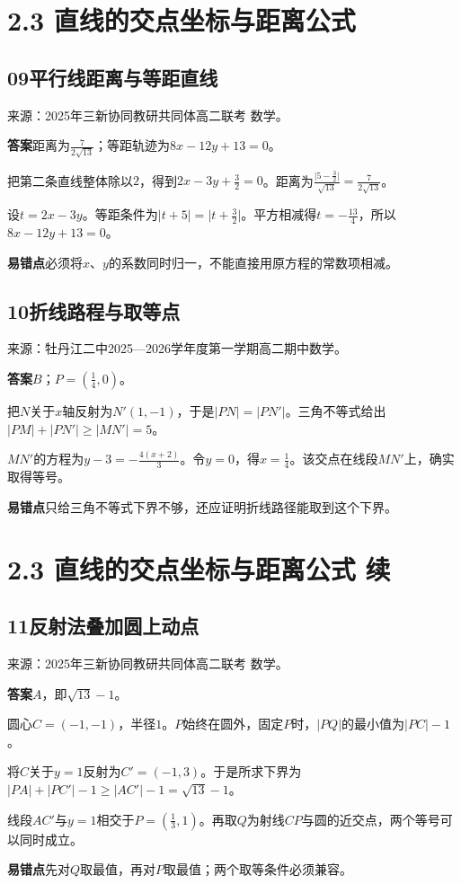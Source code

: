 \documentclass[UTF8,11pt,a4paper,fontset=windows]{ctexart}
\newcommand{\qhead}[2]{\subsection{#1\texorpdfstring{\quad}{ }#2}}
\newcommand{\qsource}[1]{{\footnotesize 来源：#1。\par}}
\begin{document}
\clearpage

\section{2.3 直线的交点坐标与距离公式}


\qhead{09}{平行线距离与等距直线}
\qsource{2025年三新协同教研共同体高二联考 数学}
\textbf{答案}\quad 距离为\(\frac{7}{2\sqrt{13}}\)；等距轨迹为\(8x- 12y+ 13= 0\)。\par
把第二条直线整体除以\(2\)，得到\(2x- 3y+ \frac{3}{2}= 0\)。距离为\(\frac{\lvert 5- \frac{3}{2}\rvert }{\sqrt{13}}= \frac{7}{2\sqrt{13}}\)。\par
设\(t= 2x- 3y\)。等距条件为\(\lvert t+ 5\rvert = \lvert t+ \frac{3}{2}\rvert \)。平方相减得\(t= - \frac{13}{4}\)，所以\(8x- 12y+ 13= 0\)。\par
{\small\textbf{易错点}\quad 必须将\(x\)、\(y\)的系数同时归一，不能直接用原方程的常数项相减。\par}

\qhead{10}{折线路程与取等点}
\qsource{牡丹江二中2025—2026学年度第一学期高二期中数学}
\textbf{答案}\quad \(B\)；\(P= \left(\frac{1}{4},\allowbreak 0\right)\)。\par
把\(N\)关于\(x\)轴反射为\(N'\left(1,\allowbreak - 1\right)\)，于是\(\lvert PN\rvert = \lvert PN'\rvert \)。三角不等式给出\(\lvert PM\rvert + \lvert PN'\rvert \ge \lvert MN'\rvert = 5\)。\par
\(MN'\)的方程为\(y- 3= - \frac{4\left(x+ 2\right)}{3}\)。令\(y= 0\)，得\(x= \frac{1}{4}\)。该交点在线段\(MN'\)上，确实取得等号。\par
{\small\textbf{易错点}\quad 只给三角不等式下界不够，还应证明折线路径能取到这个下界。\par}

\clearpage

\section{2.3 直线的交点坐标与距离公式 续}

\qhead{11}{反射法叠加圆上动点}
\qsource{2025年三新协同教研共同体高二联考 数学}
\textbf{答案}\quad \(A\)，即\(\sqrt{13}- 1\)。\par
圆心\(C= \left(- 1,\allowbreak - 1\right)\)，半径\(1\)。\(P\)始终在圆外，固定\(P\)时，\(\lvert PQ\rvert \)的最小值为\(\lvert PC\rvert - 1\)。\par
将\(C\)关于\(y= 1\)反射为\(C'= \left(- 1,\allowbreak 3\right)\)。于是所求下界为\(\lvert PA\rvert + \lvert PC'\rvert - 1\ge \lvert AC'\rvert - 1= \sqrt{13}- 1\)。\par
线段\(AC'\)与\(y= 1\)相交于\(P= \left(\frac{1}{3},\allowbreak 1\right)\)。再取\(Q\)为射线\(CP\)与圆的近交点，两个等号可以同时成立。\par
{\small\textbf{易错点}\quad 先对\(Q\)取最值，再对\(P\)取最值；两个取等条件必须兼容。\par}
\end{document}
